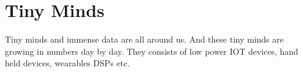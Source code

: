 \documentclass[../../main]{subfiles}
\begin{document}
\section{Tiny Minds} \label{sec:}

Tiny minds and immense data are all around us. And these tiny minds are growing in
numbers day by day. They consists of low power IOT devices, hand held devices, wearables
DSPs etc.
\end{document}
